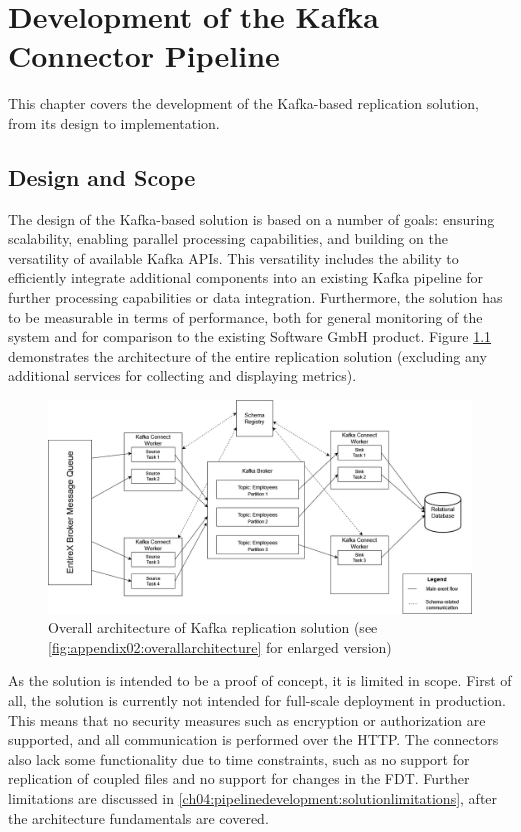 \chapter{Development of the Kafka Connector Pipeline}
\label{ch04:pipelinedevelopment}
This chapter covers the development of the Kafka-based replication solution, from its design to implementation.
\section{Design and Scope}
The design of the Kafka-based solution is based on a number of goals: ensuring scalability, enabling parallel processing capabilities, and building on the versatility of available Kafka \ac{APIs}. This versatility includes the ability to efficiently integrate additional components into an existing Kafka pipeline for further processing capabilities or data integration. Furthermore, the solution has to be measurable in terms of performance, both for general monitoring of the system and for comparison to the existing Software GmbH product. Figure \ref{fig:chapter04:overallarchitecture} demonstrates the architecture of the entire replication solution (excluding any additional services for collecting and displaying metrics).

\begin{figure}[htbp]
 \centering
 \includegraphics[width=1\textwidth]{chapters/images/kafka pipeline overall architecture enlarged.drawio.png}
 \caption[Overall architecture of Kafka replication solution]{Overall architecture of Kafka replication solution (see \ref{fig:appendix02:overallarchitecture} for enlarged version)}
 \label{fig:chapter04:overallarchitecture}
\end{figure}

As the solution is intended to be a proof of concept, it is limited in scope. First of all, the solution is currently not intended for full-scale deployment in production. This means that no security measures such as encryption or authorization are supported, and all communication is performed over the \ac{HTTP}. The connectors also lack some functionality due to time constraints, such as no support for replication of coupled files and no support for changes in the \ac{FDT}. Further limitations are discussed in \ref{ch04:pipelinedevelopment:solutionlimitations}, after the architecture fundamentals are covered.

